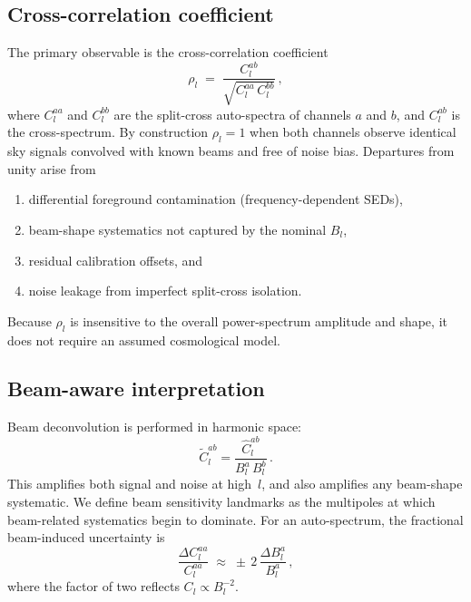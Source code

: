 \documentclass[twocolumn,showpacs,preprintnumbers,amsmath,amssymb,floatfix,prd]{revtex4-2}
\def\ell{l}%
\begin{document}
\subsection{Cross-correlation coefficient}\label{sec:rhol}

The primary observable is the cross-correlation coefficient
\begin{equation}\label{eq:rhol}
\rho_\ell \;=\; \frac{C_\ell^{ab}}{\sqrt{C_\ell^{aa}\,C_\ell^{bb}}}\,,
\end{equation}
where $C_\ell^{aa}$ and $C_\ell^{bb}$ are the split-cross auto-spectra
of channels $a$ and $b$, and $C_\ell^{ab}$ is the cross-spectrum.
By construction $\rho_\ell=1$ when both channels observe identical sky
signals convolved with known beams and free of noise bias.  Departures
from unity arise from
\begin{enumerate}
\item differential foreground contamination (frequency-dependent SEDs),
\item beam-shape systematics not captured by the nominal $B_\ell$,
\item residual calibration offsets, and
\item noise leakage from imperfect split-cross isolation.
\end{enumerate}
Because $\rho_\ell$ is insensitive to the overall power-spectrum amplitude
and shape, it does not require an assumed cosmological model.

\subsection{Beam-aware interpretation}\label{sec:beamaware}

Beam deconvolution is performed in harmonic space:
\begin{equation}
\tilde{C}_\ell^{ab} = \frac{\hat{C}_\ell^{ab}}{B_\ell^a\, B_\ell^b}\,.
\end{equation}
This amplifies both signal and noise at high~$\ell$, and also amplifies
any beam-shape systematic.  We define beam sensitivity landmarks as the
multipoles at which beam-related systematics begin to dominate.  For an
auto-spectrum, the fractional beam-induced uncertainty is
\begin{equation}\label{eq:beamprop_auto}
\frac{\Delta C_\ell^{aa}}{C_\ell^{aa}}
  \;\approx\; \pm\,2\,\frac{\Delta B_\ell^a}{B_\ell^a}\,,
\end{equation}
where the factor of two reflects $C_\ell\propto B_\ell^{-2}$.
\end{document}
